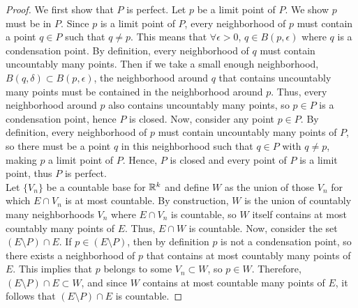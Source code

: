 \documentclass[12pt]{article}
\begin{document}
\begin{exercise}{27}
    \begin{proof}
        We first show that $P$ is perfect. Let $p$ be a limit point of $P$. We show $p$ must be in $P$. Since $p$ is a limit point of $P$, every neighborhood of $p$ must contain a point $q \in P$ such that $q \neq p$. This means that $\forall \epsilon > 0$, $q \in B(p, \epsilon)$ where $q$ is a condensation point. By definition, every neighborhood of $q$ must contain uncountably many points. Then if we take a small enough neighborhood, $B(q, \delta) \subset B(p, \epsilon)$, the neighborhood around $q$ that contains uncountably many points must be contained in the neighborhood around $p$. Thus, every neighborhood around $p$ also contains uncountably many points, so $p \in P$ is a condensation point, hence $P$ is closed. Now, consider any point $p \in P$. By definition, every neighborhood of $p$ must contain uncountably many points of $P$, so there must be a point $q$ in this neighborhood such that $q \in P$ with $q \neq p$, making $p$ a limit point of $P$. Hence, $P$ is closed and every point of $P$ is a limit point, thus $P$ is perfect. \\
        Let $\{ V_n \}$ be a countable base for $\mathbb{R}^k$ and define $W$ as the union of those $V_n$ for which $E \cap V_n$ is at most countable. By construction, $W$ is the union of countably many neighborhoods $V_n$ where $E \cap V_n$ is countable, so $W$ itself contains at most countably many points of $E$. Thus, $E \cap W$ is countable. Now, consider the set $(E \setminus P) \cap E$. If $p \in (E \setminus P)$, then by definition $p$ is not a condensation point, so there exists a neighborhood of $p$ that contains at most countably many points of $E$. This implies that $p$ belongs to some $V_n \subset W$, so $p \in W$. Therefore, $(E \setminus P) \cap E \subset W$, and since $W$ contains at most countable many points of $E$, it follows that $(E \setminus P) \cap E$ is countable. 
    \end{proof}
\end{exercise}
\end{document}

